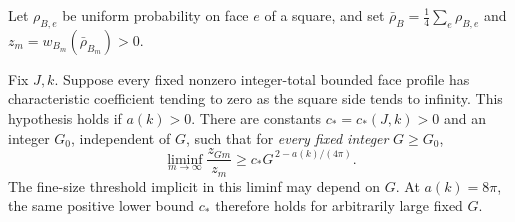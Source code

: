 Let $\rho_{B,e}$ be uniform probability on face $e$ of a square, and set
$\bar\rho_B=\frac14\sum_e\rho_{B,e}$ and
$z_m=w_{B_m}(\bar\rho_{B_m})>0$.

\begin{lemma}\label{st:critical-face-ratio}
Fix $J,k$. Suppose every fixed nonzero integer-total bounded face profile
has characteristic coefficient tending to zero as the square side tends
to infinity. This hypothesis holds if $a(k)>0$. There are constants
$c_*=c_*(J,k)>0$ and an integer $G_0$, independent of $G$, such that for
\emph{every fixed integer} $G\ge G_0$,
\begin{equation}\label{st:face-ratio}
 \liminf_{m\to\infty}\frac{z_{Gm}}{z_m}
       \ge c_*G^{\,2-a(k)/(4\pi)}.
\end{equation}
The fine-size threshold implicit in this liminf may depend on $G$.
At $a(k)=8\pi$, the same positive lower bound $c_*$ therefore holds
for arbitrarily large fixed $G$.
\end{lemma}

